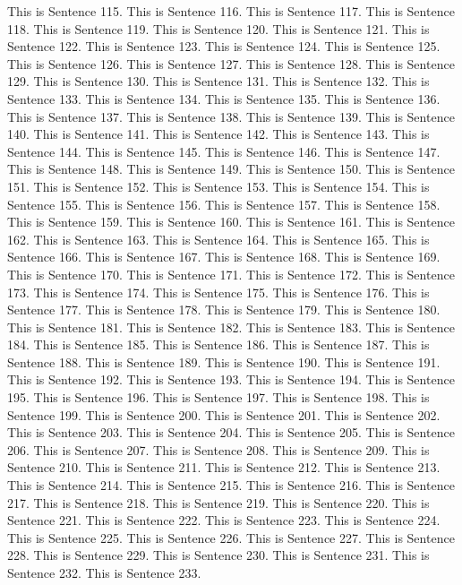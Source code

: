 \documentclass{article}
\begin{document}
This is Sentence 115.
This is Sentence 116.
This is Sentence 117.
This is Sentence 118.
This is Sentence 119.
This is Sentence 120.
This is Sentence 121.
This is Sentence 122.
This is Sentence 123.
This is Sentence 124.
This is Sentence 125.
This is Sentence 126.
This is Sentence 127.
This is Sentence 128.
This is Sentence 129.
This is Sentence 130.
This is Sentence 131.
This is Sentence 132.
This is Sentence 133.
This is Sentence 134.
This is Sentence 135.
This is Sentence 136.
This is Sentence 137.
This is Sentence 138.
This is Sentence 139.
This is Sentence 140.
This is Sentence 141.
This is Sentence 142.
This is Sentence 143.
This is Sentence 144.
This is Sentence 145.
This is Sentence 146.
This is Sentence 147.
This is Sentence 148.
This is Sentence 149.
This is Sentence 150.
This is Sentence 151.
This is Sentence 152.
This is Sentence 153.
This is Sentence 154.
This is Sentence 155.
This is Sentence 156.
This is Sentence 157.
This is Sentence 158.
This is Sentence 159.
This is Sentence 160.
This is Sentence 161.
This is Sentence 162.
This is Sentence 163.
This is Sentence 164.
This is Sentence 165.
This is Sentence 166.
This is Sentence 167.
This is Sentence 168.
This is Sentence 169.
This is Sentence 170.
This is Sentence 171.
This is Sentence 172.
This is Sentence 173.
This is Sentence 174.
This is Sentence 175.
This is Sentence 176.
This is Sentence 177.
This is Sentence 178.
This is Sentence 179.
This is Sentence 180.
This is Sentence 181.
This is Sentence 182.
This is Sentence 183.
This is Sentence 184.
This is Sentence 185.
This is Sentence 186.
This is Sentence 187.
This is Sentence 188.
This is Sentence 189.
This is Sentence 190.
This is Sentence 191.
This is Sentence 192.
This is Sentence 193.
This is Sentence 194.
This is Sentence 195.
This is Sentence 196.
This is Sentence 197.
This is Sentence 198.
This is Sentence 199.
This is Sentence 200.
This is Sentence 201.
This is Sentence 202.
This is Sentence 203.
This is Sentence 204.
This is Sentence 205.
This is Sentence 206.
This is Sentence 207.
This is Sentence 208.
This is Sentence 209.
This is Sentence 210.
This is Sentence 211.
This is Sentence 212.
This is Sentence 213.
This is Sentence 214.
This is Sentence 215.
This is Sentence 216.
This is Sentence 217.
This is Sentence 218.
This is Sentence 219.
This is Sentence 220.
This is Sentence 221.
This is Sentence 222.
This is Sentence 223.
This is Sentence 224.
This is Sentence 225.
This is Sentence 226.
This is Sentence 227.
This is Sentence 228.
This is Sentence 229.
This is Sentence 230.
This is Sentence 231.
This is Sentence 232.
This is Sentence 233.
\end{document}
